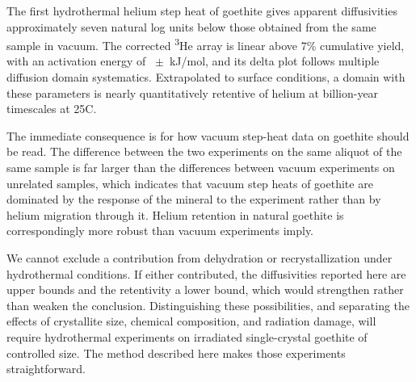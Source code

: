 The first hydrothermal helium step heat of goethite gives apparent diffusivities approximately seven natural log units below those obtained from the same sample in vacuum. The corrected \textsuperscript{3}He array is linear above 7\% cumulative yield, with an activation energy of \ChTwoEa\ $\pm$ \ChTwoEaErr\,kJ/mol, and its delta plot follows multiple diffusion domain systematics. Extrapolated to surface conditions, a domain with these parameters is nearly quantitatively retentive of helium at billion-year timescales at 25\textdegree C.

The immediate consequence is for how vacuum step-heat data on goethite should be read. The difference between the two experiments on the same aliquot of the same sample is far larger than the differences between vacuum experiments on unrelated samples, which indicates that vacuum step heats of goethite are dominated by the response of the mineral to the experiment rather than by helium migration through it. Helium retention in natural goethite is correspondingly more robust than vacuum experiments imply.

We cannot exclude a contribution from dehydration or recrystallization under hydrothermal conditions. If either contributed, the diffusivities reported here are upper bounds and the retentivity a lower bound, which would strengthen rather than weaken the conclusion. Distinguishing these possibilities, and separating the effects of crystallite size, chemical composition, and radiation damage, will require hydrothermal experiments on irradiated single-crystal goethite of controlled size. The method described here makes those experiments straightforward.
